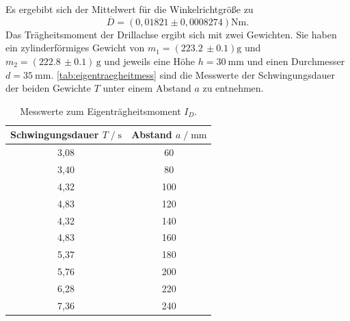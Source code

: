 Es ergebibt sich der Mittelwert für die Winkelrichtgröße zu
\begin{equation}
  \overline D = (0,01821\pm 0,0008274) \si{\newton\meter}.
\end{equation}
Das Trägheitsmoment der Drillachse ergibt sich mit zwei Gewichten.
Sie haben ein zylinderförmiges Gewicht von $m_1 = (223.2 \,\pm 0.1) \text{g}$ und $m_2 = (222.8 \,\pm 0.1)\, \text{g}$ und jeweils eine
Höhe $h=\SI{30}{\milli\meter}$ und einen Durchmesser $d=\SI{35}{\milli\meter}$.
\autoref{tab:eigentraegheitmess} sind die Messwerte der Schwingungsdauer der beiden Gewichte $T$ unter einem Abstand $a$ zu entnehmen.

\begin{table}[H]
  \centering
   \caption{Messwerte zum Eigenträgheitsmoment $I_D$.}
   \label{tab:eigentraegheitmess}
   \begin{tabular}{c c}
       \toprule
       Schwingungsdauer $ T \;/\; \si{\second}$ & Abstand $a \;/\; \si{\milli\meter}$ \\
       \midrule
       3,08 & 60 \\
       3,40 & 80 \\
       4,32 & 100 \\
       4,83 & 120 \\
       4,32 & 140 \\
       4,83 & 160 \\
       5,37 & 180 \\
       5,76 & 200 \\
       6,28 & 220 \\
       7,36 & 240 \\
       \bottomrule
   \end{tabular}
\end{table}





